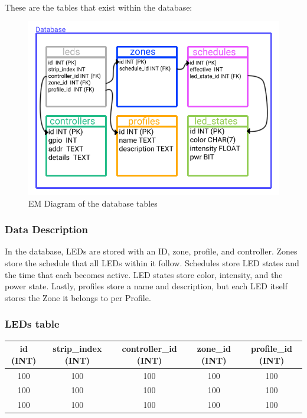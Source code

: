 \documentclass[onecolumn, draftclsnofoot,10pt, compsoc]{IEEEtran}
\begin{document}
			\noindent \\These are the tables that exist within the database:
			\begin{center}
				\begin{figure}[H]
					\includegraphics[width=\linewidth]{systemDiagrams/database.png}
					\caption{EM Diagram of the database tables}
					\label{fig:databaseDiagram}
				\end{figure}
			\end{center}

			\subsubsection{Data Description}
			In the database, LEDs are stored with an ID, zone, profile, and controller. Zones store the schedule that all LEDs within it follow.
			Schedules store LED states and the time that each becomes active. LED states store color, intensity, and the power state.
			Lastly, profiles store a name and description, but each LED itself stores the Zone it belongs to per Profile.

			\subsubsection{LEDs table}
				\begin{tabular}{ |c|c|c|c|c| }
					\hline
					id (INT) & strip\_index (INT) & controller\_id (INT) & zone\_id (INT) & profile\_id (INT) \\
					\hline
					100 & 100 & 100 & 100 & 100 \\
					100 & 100 & 100 & 100 & 100 \\
					100 & 100 & 100 & 100 & 100 \\
					\hline
				\end{tabular}
\end{document}
